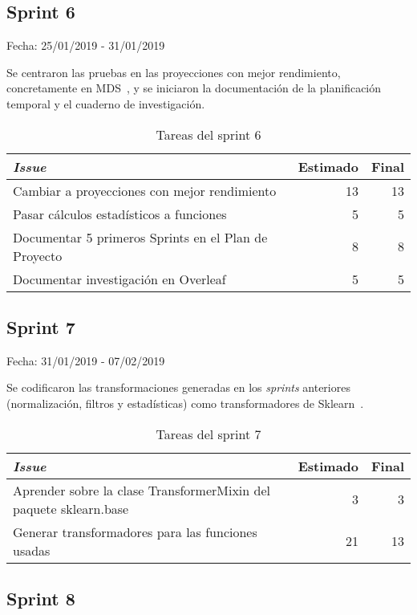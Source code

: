 \subsection{Sprint 6}

Fecha: 25/01/2019 - 31/01/2019

Se centraron las pruebas en las proyecciones con mejor rendimiento, concretamente en MDS~\cite{MDS}, y se iniciaron la documentación de la planificación temporal y el cuaderno de investigación. 

\begin{table}[H]
	\begin{tabularx}{\textwidth}{Xrr}
		\toprule \textbf{\textit{Issue}} & \textbf{Estimado} & \textbf{Final}\\
		\toprule
		Cambiar a proyecciones con mejor rendimiento & 13 & 13 \\
		Pasar cálculos estadísticos a funciones & 5 & 5 \\
		Documentar 5 primeros Sprints en el Plan de Proyecto & 8 & 8 \\
		Documentar investigación en Overleaf~\cite{overleaf} & 5 & 5 \\
		\bottomrule
	\end{tabularx}
	\caption{Tareas del sprint 6}
\end{table}

\subsection{Sprint 7}

Fecha: 31/01/2019 - 07/02/2019

Se codificaron las transformaciones generadas en los \textit{sprints} anteriores (normalización, filtros y estadísticas) como transformadores de Sklearn~\cite{scikit-learn}.

\begin{table}[H]
	\begin{tabularx}{\textwidth}{Xrr}
		\toprule \textbf{\textit{Issue}} & \textbf{Estimado} & \textbf{Final}\\
		\toprule 
		Aprender sobre la clase TransformerMixin del paquete sklearn.base~\cite{TransformerMixin} & 3 & 3 \\
		Generar transformadores para las funciones usadas & 21 & 13 \\
		\bottomrule
	\end{tabularx}
	\caption{Tareas del sprint 7}
\end{table}

\subsection{Sprint 8}

